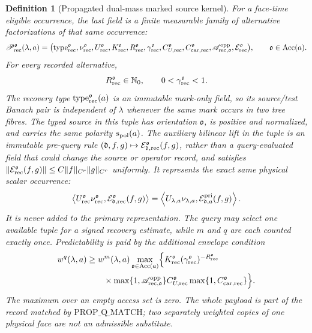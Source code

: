 \documentclass[11pt]{article}
\newtheorem{definition}[theorem]{Definition}
\begin{document}
\begin{definition}[Propagated dual-mass marked source kernel]
For a face-time eligible occurrence, the last field is a finite measurable
family of \emph{alternative factorizations of that same occurrence}:
\begin{equation}
\label{eq:alternative-recovery-payload}
 \mathscr P_{\rm rec}^{\mathfrak o}(\lambda,a)
 =\bigl(\operatorname{type}_{\rm rec}^{\mathfrak o},
   \nu_{\rm rec}^{\mathfrak o},U_{\rm rec}^{\mathfrak o},
   K_{\rm rec}^{\mathfrak o},R_{\rm rec}^{\mathfrak o},
   \gamma_{\rm rec}^{\mathfrak o},C_{U,\rm rec}^{\mathfrak o},
   C_{{\rm car},\rm rec}^{\mathfrak o},
   \mathscr A_{{\rm rec},\mathfrak o}^{\rm opp},
   \mathcal E_{\rm rec}^{\mathfrak o}\bigr),
 \qquad \mathfrak o\in\operatorname{Acc}(a).
\end{equation}
For every recorded alternative,
\begin{equation}
\label{eq:alternative-recovery-clock-types}
 R_{\rm rec}^{\mathfrak o}\in\mathbb N_0,
 \qquad 0<\gamma_{\rm rec}^{\mathfrak o}<1.
\end{equation}
The recovery type $\operatorname{type}_{\rm rec}^{\mathfrak o}(a)$ is an
immutable mark-only field, so its source/test Banach pair is independent of
$\lambda$ whenever the same mark occurs in two tree fibres.  The typed
source in this tuple has orientation $\mathfrak o$, is positive
and normalized, and carries the same polarity $s_{\rm pol}(a)$.  The
auxiliary bilinear lift in the tuple is an immutable pre-query rule
$(\mathfrak d,f,g)\mapsto
\mathcal E_{\mathfrak d,\rm rec}^{\mathfrak o}(f,g)$, rather than a
query-evaluated field that could change the source or operator record, and
satisfies $\|\mathcal E_{\rm rec}^{\mathfrak o}(f,g)\|
\le C\|f\|_{C^r}\|g\|_{C^r}$ uniformly.  It represents
the exact same physical scalar occurrence:
\begin{equation}
\label{eq:alternative-recovery-exact-current}
 \left\langle U_{\rm rec}^{\mathfrak o}
          \nu_{\rm rec}^{\mathfrak o},
          \mathcal E_{\mathfrak d,\rm rec}^{\mathfrak o}(f,g)\right\rangle
 =\left\langle U_{\lambda,a}\nu_{\lambda,a},
          \mathcal E_{\mathfrak d,a}^{\rm pri}(f,g)\right\rangle .
\end{equation}
It is never added to the primary representation.  The query may select one
available tuple for a signed recovery estimate, while $m$ and $q$ are each
counted exactly once.  Predictability is paid by the additional envelope
condition
\begin{equation}
\label{eq:alternative-recovery-envelope}
 \begin{aligned}
 w^q(\lambda,a)&\ge w^m(\lambda,a)
 \max_{\mathfrak o\in\operatorname{Acc}(a)}\Bigl\{
 K_{\rm rec}^{\mathfrak o}
 (\gamma_{\rm rec}^{\mathfrak o})^{-R_{\rm rec}^{\mathfrak o}}\\
 &\qquad\times
 \max\{1,\mathscr A_{{\rm rec},\mathfrak o}^{\rm opp}\}
 C_{U,\rm rec}^{\mathfrak o}
 \max\{1,C_{{\rm car},\rm rec}^{\mathfrak o}\}\Bigr\}.
 \end{aligned}
\end{equation}
The maximum over an empty access set is zero.  The whole payload is part of
the record matched by $\mathrm{PROP\_Q\_MATCH}$; two separately weighted
copies of one physical face are not an admissible substitute.


\end{definition}
\end{document}
